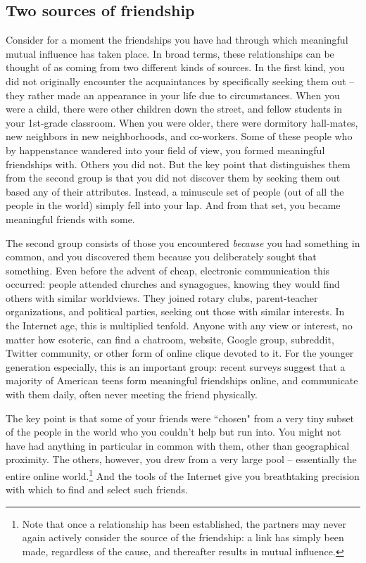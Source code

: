 
\subsection{Two sources of friendship}

Consider for a moment the friendships you have had through which meaningful
mutual influence has taken place. In broad terms, these relationships can be
thought of as coming from two different kinds of sources. In the first kind,
you did not originally encounter the acquaintances by specifically seeking
them out -- they rather made an appearance in your life due to circumstances.
When you were a child, there were other children down the street, and fellow
students in your 1st-grade classroom. When you were older, there were
dormitory hall-mates, new neighbors in new neighborhoods, and co-workers. Some
of these people who by happenstance wandered into your field of view, you
formed meaningful friendships with. Others you did not. But the key point that
distinguishes them from the second group is that you did not discover them by
seeking them out based any of their attributes. Instead, a minuscule set of
people (out of all the people in the world) simply fell into your lap. And
from that set, you became meaningful friends with some.

The second group consists of those you encountered \textit{because} you had
something in common, and you discovered them because you deliberately sought
that something. Even before the advent of cheap, electronic communication this
occurred: people attended churches and synagogues, knowing they would find
others with similar worldviews. They joined rotary clubs, parent-teacher
organizations, and political parties, seeking out those with similar
interests. In the Internet age, this is multiplied tenfold. Anyone with any
view or interest, no matter how esoteric, can find a chatroom, website, Google
group, subreddit, Twitter community, or other form of online clique devoted to
it. For the younger generation especially, this is an important group: recent
surveys suggest that a majority of American teens form meaningful friendships
online, and communicate with them daily, often never meeting the friend
physically.\cite{lenhart_teens_2015}

The key point is that some of your friends were ``chosen" from a very tiny
subset of the people in the world who you couldn't help but run into. You
might not have had anything in particular in common with them, other than
geographical proximity. The others, however, you drew from a very large pool
-- essentially the entire online world.\footnote{Note that once a relationship
has been established, the partners may never again actively consider the
source of the friendship: a link has simply been made, regardless of the
cause, and thereafter results in mutual influence.} And the tools of the
Internet give you breathtaking precision with which to find and select such
friends.

